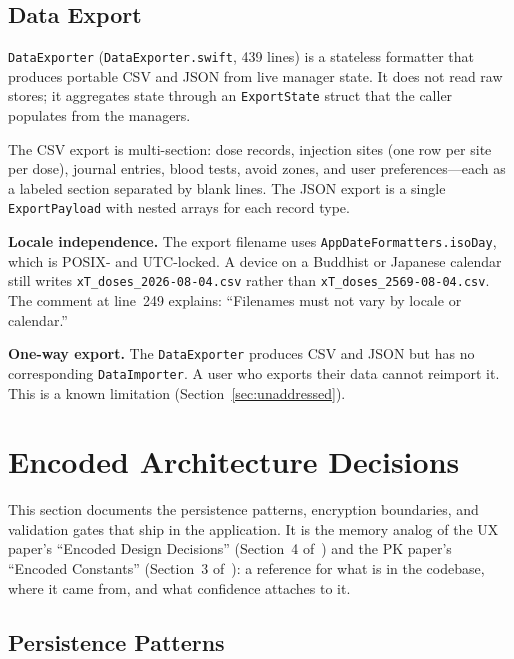 \documentclass[11pt,a4paper]{article}
\newcommand{\code}[1]{\texttt{\small #1}}
\begin{document}
\subsection{Data Export}
\label{sec:data_export}

\code{DataExporter} (\code{DataExporter.swift}, 439 lines) is a stateless
formatter that produces portable CSV and JSON from live manager state. It
does not read raw stores; it aggregates state through an
\code{ExportState} struct that the caller populates from the managers.

The CSV export is multi-section: dose records, injection sites (one row per
site per dose), journal entries, blood tests, avoid zones, and user
preferences---each as a labeled section separated by blank lines. The JSON
export is a single \code{ExportPayload} with nested arrays for each record
type.

\textbf{Locale independence.} The export filename uses
\code{AppDateFormatters.isoDay}, which is POSIX- and UTC-locked. A device
on a Buddhist or Japanese calendar still writes
\verb|xT_doses_2026-08-04.csv| rather than
\verb|xT_doses_2569-08-04.csv|. The comment at line~249 explains: ``Filenames
must not vary by locale or calendar.''

\textbf{One-way export.} The \code{DataExporter} produces CSV and JSON but
has no corresponding \code{DataImporter}. A user who exports their data
cannot reimport it. This is a known limitation
(Section~\ref{sec:unaddressed}).

\section{Encoded Architecture Decisions}
\label{sec:encoded}

This section documents the persistence patterns, encryption boundaries, and
validation gates that ship in the application. It is the memory analog of the
UX paper's ``Encoded Design Decisions'' (Section~4 of~\cite{xtux}) and the PK
paper's ``Encoded Constants'' (Section~3 of~\cite{xtpk}): a reference for
what is in the codebase, where it came from, and what confidence attaches to
it.

\subsection{Persistence Patterns}
\label{sec:persistence_patterns}
\end{document}
